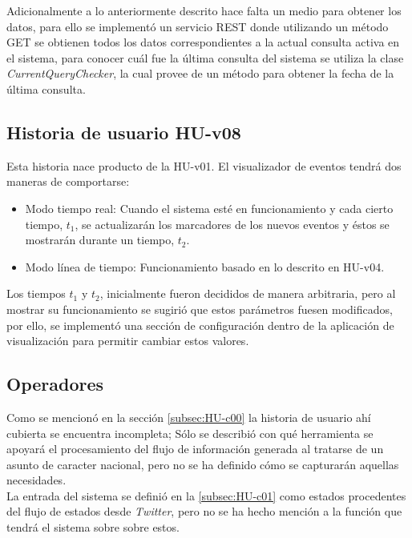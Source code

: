 Adicionalmente a lo anteriormente descrito hace falta un medio para obtener los datos, para ello se implementó un servicio REST donde utilizando un método GET se obtienen todos los datos correspondientes a la actual consulta activa en el sistema, para conocer cuál fue la última consulta del sistema se utiliza la clase \textit{CurrentQueryChecker}, la cual provee de un método para obtener la fecha de la última consulta.

\subsection{Historia de usuario HU-v08}
\label{subsec:HU-v08}

Esta historia nace producto de la HU-v01. El visualizador de eventos tendrá dos maneras de comportarse:

\begin{itemize}
\item Modo tiempo real: Cuando el sistema esté en funcionamiento y cada cierto tiempo, $t_{1}$, se actualizarán los marcadores de los nuevos eventos y éstos se mostrarán durante un tiempo, $t_{2}$.
\item Modo línea de tiempo: Funcionamiento basado en lo descrito en HU-v04.
\end{itemize}

Los tiempos $t_{1}$ y $t_{2}$, inicialmente fueron decididos de manera arbitraria, pero al mostrar su funcionamiento se sugirió que estos parámetros fuesen modificados, por ello, se implementó una sección de configuración dentro de la aplicación de visualización para permitir cambiar estos valores.

\subsection{Operadores}
\label{subsec:operadores}

Como se mencionó en la sección \ref{subsec:HU-c00} la historia de usuario ahí cubierta se encuentra incompleta; Sólo se describió con qué herramienta se apoyará el procesamiento del flujo de información generada al tratarse de un asunto de caracter nacional, pero no se ha definido cómo se capturarán aquellas necesidades.\\

La entrada del sistema se definió en la \ref{subsec:HU-c01} como estados procedentes del flujo de estados desde \textit{Twitter}, pero no se ha hecho mención a la función que tendrá el sistema sobre sobre estos.\\

